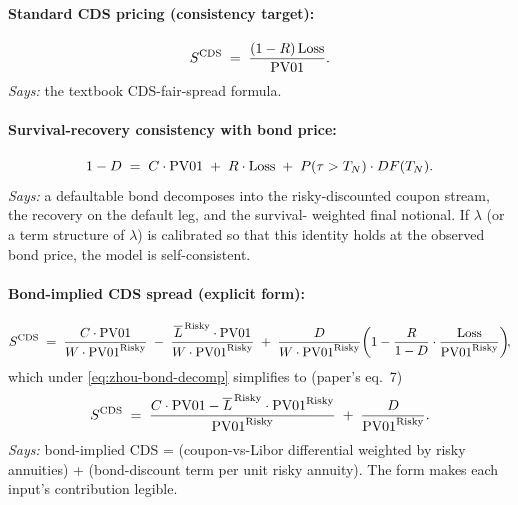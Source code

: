 \documentclass[11pt,a4paper]{article}
\begin{document}
\paragraph{Standard CDS pricing (consistency target):}
\begin{equation}\label{eq:zhou-cds-standard}
  S^{\mathrm{CDS}} \;=\; \frac{(1 - R)\, \mathrm{Loss}}{\mathrm{PV01}}.
\end{equation}
\textit{Says:} the textbook CDS-fair-spread formula.

\paragraph{Survival-recovery consistency with bond price:}
\begin{equation}\label{eq:zhou-bond-decomp}
  1 - D \;=\; C \cdot \mathrm{PV01} \;+\; R \cdot \mathrm{Loss} \;+\; P(\tau > T_N) \cdot DF(T_N).
\end{equation}
\textit{Says:} a defaultable bond decomposes into the risky-discounted
coupon stream, the recovery on the default leg, and the survival-
weighted final notional. If $\lambda$ (or a term structure of
$\lambda$) is calibrated so that this identity holds at the observed
bond price, the model is self-consistent.

\paragraph{Bond-implied CDS spread (explicit form):}
\begin{equation}\label{eq:zhou-cds-explicit}
  S^{\mathrm{CDS}} \;=\; \frac{C \cdot \mathrm{PV01}}{W \cdot \mathrm{PV01}^{\text{Risky}}}
          \;-\; \frac{\overline L^{\,\text{Risky}} \cdot \mathrm{PV01}}{W \cdot \mathrm{PV01}^{\text{Risky}}}
          \;+\; \frac{D}{W \cdot \mathrm{PV01}^{\text{Risky}}}\!\left(1 - \frac{R}{1 - D} \cdot \frac{\mathrm{Loss}}{\mathrm{PV01}^{\text{Risky}}}\right)\!\!,
\end{equation}
which under \eqref{eq:zhou-bond-decomp} simplifies to (paper's eq.~7)
\begin{equation}\label{eq:zhou-cds-simplified}
  S^{\mathrm{CDS}} \;=\; \frac{C \cdot \mathrm{PV01} - \overline L^{\,\text{Risky}} \cdot \mathrm{PV01}^{\text{Risky}}}{\mathrm{PV01}^{\text{Risky}}}
            \;+\; \frac{D}{\mathrm{PV01}^{\text{Risky}}}.
\end{equation}
\textit{Says:} bond-implied CDS = (coupon-vs-Libor differential
weighted by risky annuities) + (bond-discount term per unit risky
annuity). The form makes each input's contribution legible.
\end{document}
